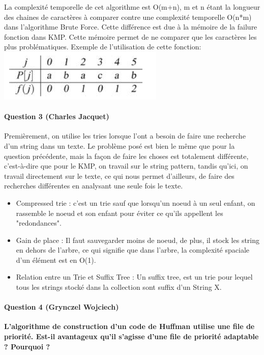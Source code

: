 \documentclass[a4paper]{article}
\begin{document}
La complexité temporelle de cet algorithme est O(m+n), m et n étant la longueur des chaines de caractères à comparer contre une complexité temporelle O(n*m) dans l'algorithme Brute Force. Cette différence est due à la mémoire de la failure fonction dans  KMP. Cette mémoire permet de ne comparer que les caractères les plus problématiques. Exemple de l'utilisation de cette fonction:\\
\includegraphics[scale=1]{imgFailure.png}

\paragraph*{Question 3 (Charles Jacquet)} 

Premièrement, on utilise les tries lorsque l'ont a besoin de faire une recherche d'un string dans un texte. Le problème posé est bien le même que pour la question précédente, mais la façon de faire les choses est totalement différente, c'est-à-dire que pour le KMP, on travail sur le string pattern, tandis qu'ici, on travail directement sur le texte, ce qui nous permet d'ailleurs, de faire des recherches différentes en analysant une seule fois le texte.
\begin{itemize}
\item {Compressed trie} : c'est un trie sauf que lorsqu'un noeud à un seul enfant, on rassemble le noeud et son enfant pour éviter ce qu'ils appellent les "redondances".
\item {Gain de place} : Il faut sauvegarder moins de noeud, de plus, il stock les string en dehors de l'arbre, ce qui signifie que dans l'arbre, la complexité spaciale d'un élément est en O(1).
\item {Relation entre un Trie et Suffix Tree} : Un suffix tree, est un trie pour lequel tous les strings stocké dans la collection sont suffix d'un String X.
\end{itemize}
\newpage
\paragraph*{Question 4 (Grynczel Wojciech)}
\textbf{L’algorithme de construction d’un code de Huffman utilise une file de priorité. Est-il avantageux qu’il s’agisse d’une file de priorité adaptable ? Pourquoi ?}
\end{document}
